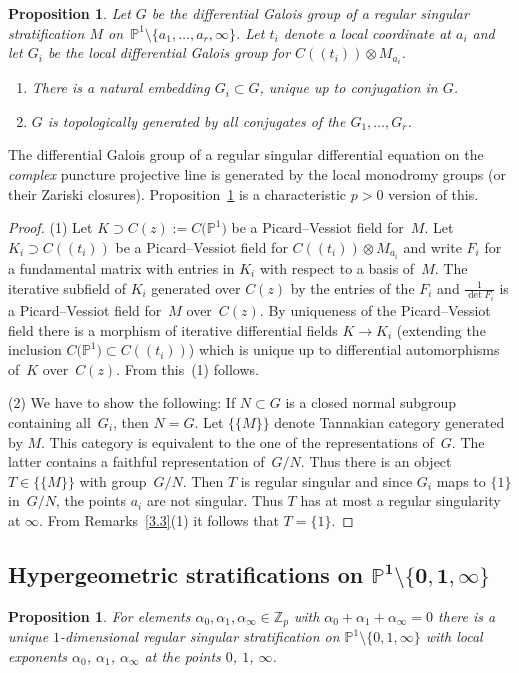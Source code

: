 \documentclass[10pt,a4paper]{amsart}
\numberwithin{equation}{section}
\newtheorem{Proposition}[Theorem]{Proposition}
\begin{document}
\begin{Proposition}\label{3.4} Let $G$ be the differential Galois group of a regular singular stratification $M$ on~$\mathbb{P}^1\setminus \{a_1,\dots ,a_r,\infty \}$. Let $t_i$ denote a local coordinate at $a_i$ and let $G_i$ be the local differential Galois group for $ C((t_i))\otimes M_{a_i}$.
 \begin{enumerate}\itemsep=0pt
\item[$(1)$] There is a natural embedding $G_i\subset G$, unique up to conjugation in $G$.
\item[$(2)$] $G$ is topologically generated by all conjugates of the $G_1,\dots ,G_r$.
\end{enumerate}
\end{Proposition}

The differential Galois group of a regular singular differential equation on the {\it complex} puncture projective line is generated by the local monodromy groups (or their Zariski closures). Proposition~\ref{3.4} is a characteristic $p>0$ version of this.
\begin{proof} (1) Let $K\supset C(z):=C\big(\mathbb{P}^1\big)$ be a Picard--Vessiot field for~$M$. Let $K_i\supset C((t_i))$ be a Picard--Vessiot field for $ C((t_i))\otimes M_{a_i}$ and write $F_i$ for a fundamental matrix with entries in $K_i$ with respect to a basis of~$M$. The iterative subfield of $K_i$ generated over $C(z)$ by the entries of the $F_i$ and $\frac{1}{\det F_i}$ is a Picard--Vessiot field for~$M$ over~$C(z)$. By uniqueness of the Picard--Vessiot field there is a morphism of iterative differential fields $K\rightarrow K_i$ (extending the inclusion $C\big(\mathbb{P}^1\big)\subset C((t_i))$) which is unique up to differential automorphisms of~$K$ over~$C(z)$. From this~(1) follows.

(2) We have to show the following: If $N\subset G$ is a closed normal subgroup containing all~$G_i$, then $N=G$. Let $\{\{M\}\}$ denote Tannakian category generated by $M$. This category is equivalent to the one of the representations of~$G$. The latter contains a faithful representation of~$G/N$. Thus there is an object $T\in \{\{M\}\}$ with group~$G/N$. Then $T$ is regular singular and since $G_i$ maps to $\{1\}$ in~$G/N$, the points $a_i$ are not singular. Thus $T$ has at most a regular singularity at $\infty$. From Remarks~\ref{3.3}(1) it follows that $T=\{1\}$. \end{proof}

\subsection[Hypergeometric stratifications on $\mathbb{P}^1\setminus \{0,1,\infty \}$]{Hypergeometric stratifications on $\boldsymbol{\mathbb{P}^1\setminus \{0,1,\infty \}}$}\label{section3.2}
\begin{Proposition}\label{3.5} For elements $\alpha _0,\alpha _1,\alpha _\infty \in \mathbb{Z}_p$ with $\alpha_0+\alpha_1+\alpha_\infty =0$ there is a unique $1$-dimensional regular singular stratification on $\mathbb{P}^1\setminus \{0,1,\infty \}$ with local exponents $\alpha_0$, $\alpha_1$, $\alpha_\infty$ at the points $0$, $1$, $\infty$.
 \end{Proposition}
\end{document}
